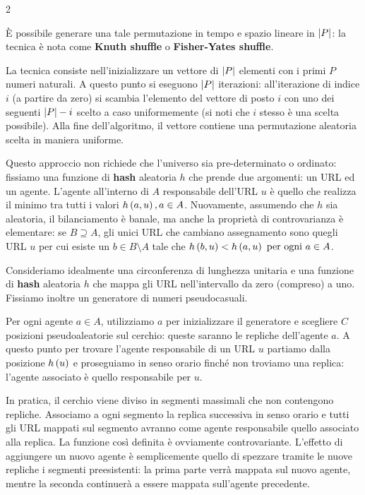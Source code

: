 \documentclass[\main/main.tex]{subfiles}
\begin{document}
\begin{multicols}{2}
\begin{definition}
    È possibile generare una tale permutazione in tempo e spazio lineare in \(\left\lvert P\right\rvert\): la tecnica è nota come \textbf{Knuth shuffle} o \textbf{Fisher-Yates shuffle}.
\end{definition}
\begin{definition}
    La tecnica consiste nell'inizializzare un vettore di \(\left\lvert P\right\rvert\) elementi con i primi \(P\) numeri naturali. A questo punto si eseguono \(\left\lvert P\right\rvert\) iterazioni: all'iterazione di indice \(i\) (a partire da zero) si scambia l'elemento del vettore di posto \(i\) con uno dei seguenti \(\left\lvert P\right\rvert - i \) scelto a caso uniformemente (si noti che \(i\) stesso è una scelta possibile). Alla fine dell'algoritmo, il vettore contiene una permutazione aleatoria scelta in maniera uniforme.
\end{definition}
\begin{definition}
    Questo approccio non richiede che l'universo sia pre-determinato o ordinato: fissiamo una funzione di \textbf{hash} aleatoria \(h\) che prende due argomenti: un URL ed un agente. L'agente all'interno di \(A\) responsabile dell'URL \(u\) è quello che realizza il minimo tra tutti i valori \(h\left(a, u\right), a \in A\). Nuovamente, assumendo che \(h\) sia aleatoria, il bilanciamento è banale, ma anche la proprietà di controvarianza è elementare: se \(B \supseteq A\), gli unici URL che cambiano assegnamento sono quegli URL \(u\) per cui esiste un \(b \in B \setminus A\) tale che \(h\left(b, u\right) < h\left(a, u\right) \text{ per ogni }a \in A\).
\end{definition}
\begin{definition}
    Consideriamo idealmente una circonferenza di lunghezza unitaria e una funzione di \textbf{hash} aleatoria \(h\) che mappa gli URL nell'intervallo da zero (compreso) a uno. Fissiamo inoltre un generatore di numeri pseudocasuali.
    
    Per ogni agente \(a \in A\), utilizziamo \(a\) per inizializzare il generatore e scegliere \(C\) posizioni pseudoaleatorie sul cerchio: queste saranno le repliche dell'agente \(a\). A questo punto per trovare l'agente responsabile di un URL \(u\) partiamo dalla posizione \(h\left(u\right)\) e proseguiamo in senso orario finché non troviamo una replica: l'agente associato è quello responsabile per \(u\).
    
    In pratica, il cerchio viene diviso in segmenti massimali che non contengono repliche. Associamo a ogni segmento la replica successiva in senso orario e tutti gli URL mappati sul segmento avranno come agente responsabile quello associato alla replica. La funzione così definita è ovviamente controvariante. L'effetto di aggiungere un nuovo agente è semplicemente quello di spezzare tramite le nuove repliche i segmenti preesistenti: la prima parte verrà mappata sul nuovo agente, mentre la seconda continuerà a essere mappata sull'agente precedente.
    

\end{definition}
\end{multicols}
\end{document}

